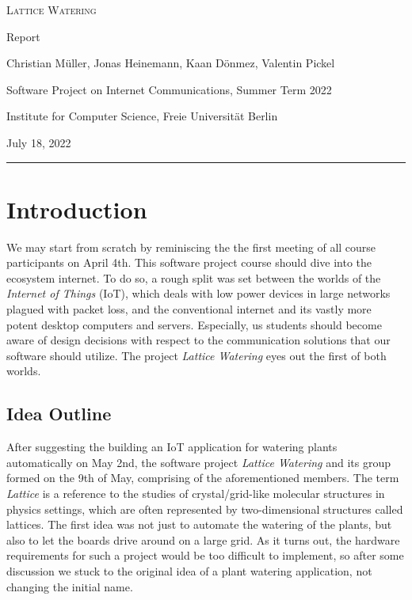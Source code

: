 \documentclass[10pt, a4paper]{article}
\begin{document}
    \begin{center}
        \large \textsc{Lattice Watering}

        \vspace{0.15cm}

        \normalsize Report

        \vspace{0.15cm}

        Christian Müller, Jonas Heinemann, Kaan Dönmez, Valentin Pickel

        \vspace{0.15cm}

        Software Project on Internet Communications, Summer Term 2022

        Institute for Computer Science, Freie Universität Berlin

        \vspace{0.15cm}

        July 18, 2022

        \rule{\linewidth}{0.5pt}
    \end{center}

    \section{Introduction}

    We may start from scratch by reminiscing the the first meeting of all course participants on April 4th. This software project course should dive into the ecosystem internet. To do so, a rough split was set between the worlds of the \emph{Internet of Things} (IoT), which deals with low power devices in large networks plagued with packet loss, and the conventional internet and its vastly more potent desktop computers and servers. Especially, us students should become aware of design decisions with respect to the communication solutions that our software should utilize. The project \emph{Lattice Watering} eyes out the first of both worlds.

    \subsection{Idea Outline}

    After suggesting the building an IoT application for watering plants automatically on May 2nd, the software project \emph{Lattice Watering} and its group formed on the 9th of May, comprising of the aforementioned members. The term \emph{Lattice} is a reference to the studies of crystal/grid-like molecular structures in physics settings, which are often represented by two-dimensional structures called lattices. The first idea was not just to automate the watering of the plants, but also to let the boards drive around on a large grid. As it turns out, the hardware requirements for such a project would be too difficult to implement, so after some discussion we stuck to the original idea of a plant watering application, not changing the initial name.
\end{document}
